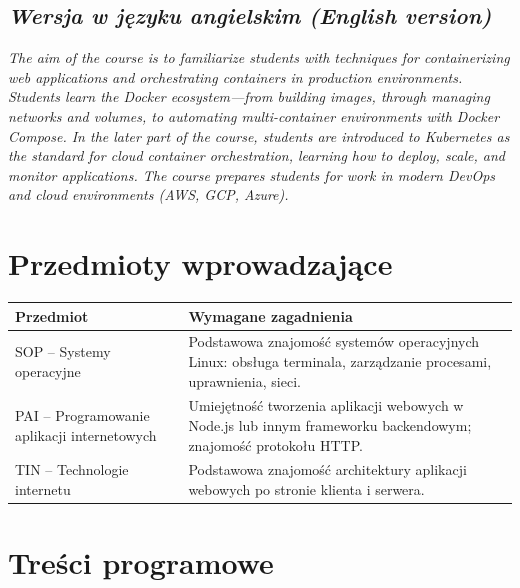 \documentclass[12pt, a4paper]{article}
\newcommand{\thdrule}{\noalign{\global\setlength{\extrarowheight}{0pt}}}
\newcommand{\thdend}{\noalign{\global\setlength{\extrarowheight}{3pt}}}
\begin{document}
\subsection*{\textit{Wersja w języku angielskim (English version)}}

\textit{The aim of the course is to familiarize students with techniques for containerizing web applications and orchestrating containers in production environments. Students learn the Docker ecosystem—from building images, through managing networks and volumes, to automating multi-container environments with Docker Compose. In the later part of the course, students are introduced to Kubernetes as the standard for cloud container orchestration, learning how to deploy, scale, and monitor applications. The course prepares students for work in modern DevOps and cloud environments (AWS, GCP, Azure).}


\section{Przedmioty wprowadzające}

{\scriptsize
\begin{tabularx}{\textwidth}{m{5cm}Y}
\thdrule\toprule
{} {\color{white}\textbf{Przedmiot}} & {\color{white}\textbf{Wymagane zagadnienia}} \\
\midrule\thdend
   SOP – Systemy operacyjne & Podstawowa znajomość systemów operacyjnych Linux: obsługa terminala, zarządzanie procesami, uprawnienia, sieci. \\
   PAI – Programowanie aplikacji internetowych & Umiejętność tworzenia aplikacji webowych w Node.js lub innym frameworku backendowym; znajomość protokołu HTTP. \\
   TIN – Technologie internetu & Podstawowa znajomość architektury aplikacji webowych po stronie klienta i serwera. \\
\bottomrule
\end{tabularx}}

\section{Treści programowe}
\end{document}
